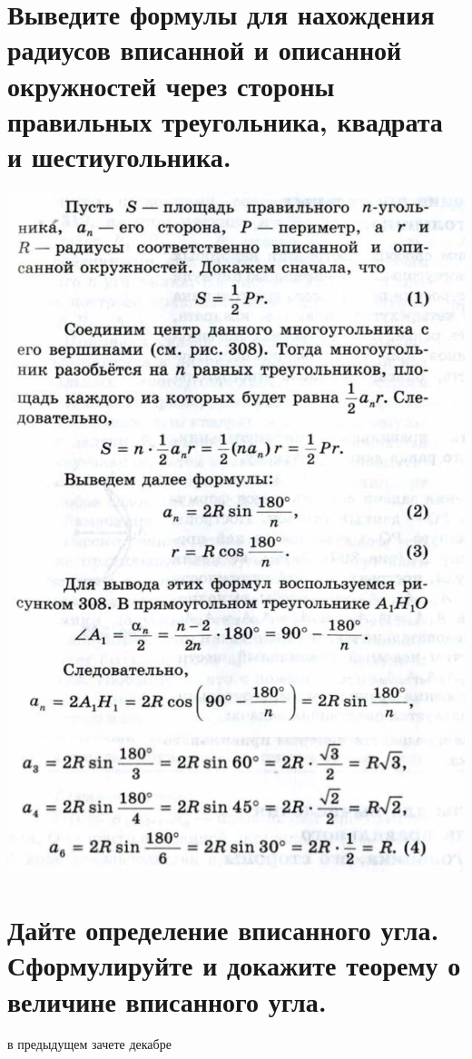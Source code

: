 \documentclass[12pt, letterpaper]{article}
\begin{document}
\section {Выведите формулы для нахождения радиусов вписанной и описанной окружностей через стороны правильных треугольника, квадрата и шестиугольника.}
\includegraphics[scale=1]{legal-3.jpg} \\
\includegraphics[scale=1]{legal-5.jpg} \\

\section {Дайте определение вписанного угла. Сформулируйте и докажите теорему о величине вписанного угла.}
в предыдущем зачете декабре
\end{document}
